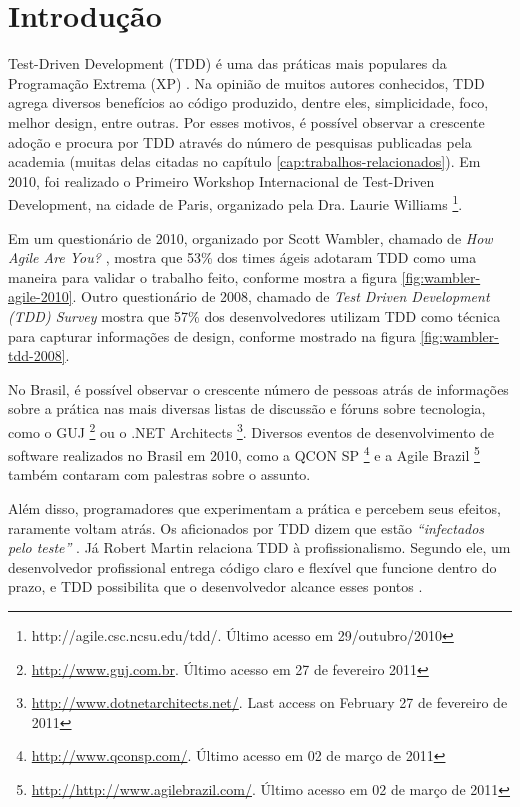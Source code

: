 \chapter{Introdução}
\label{cap:introducao}

Test-Driven Development (TDD) é uma das práticas mais populares da Programação
Extrema (XP) \cite{XPExplained}. 
Na opinião de muitos autores conhecidos, TDD agrega diversos benefícios ao
código produzido, dentre eles, simplicidade, foco, melhor design, entre outras.
Por esses motivos, é possível observar a crescente adoção e procura por TDD
através do número de pesquisas publicadas pela academia (muitas delas citadas no
capítulo \ref{cap:trabalhos-relacionados}). Em 2010, foi realizado o Primeiro
Workshop Internacional de Test-Driven Development, na cidade de Paris, 
organizado pela Dra. Laurie Williams \footnote{http://agile.csc.ncsu.edu/tdd/. 
Último acesso em 29/outubro/2010}.

Em um questionário de 2010, organizado por Scott Wambler, chamado de \textit{How
Agile Are You?} \cite{wambler-survey-agile}, mostra que 53\% dos times ágeis
adotaram TDD como uma maneira para validar o trabalho feito, conforme mostra a 
figura \ref{fig:wambler-agile-2010}. Outro questionário de 2008, 
chamado de \textit{Test Driven Development (TDD) Survey}
\cite{wambler-survey-tdd}  mostra que 57\% dos desenvolvedores utilizam TDD como
técnica para capturar informações de design, conforme mostrado na figura 
\ref{fig:wambler-tdd-2008}. 

No Brasil, é possível observar o crescente número de pessoas atrás de
informações sobre a prática nas mais diversas listas de discussão e fóruns sobre
tecnologia, como o GUJ \footnote{\url{http://www.guj.com.br}.
Último acesso em 27 de fevereiro 2011} ou o .NET Architects 
\footnote{\url{http://www.dotnetarchitects.net/}. Last access on February
27 de fevereiro de 2011}. Diversos eventos de desenvolvimento de
software realizados no Brasil em 2010, como a QCON SP
\footnote{\url{http://www.qconsp.com/}. Último acesso em 02 de março de 2011} e
a Agile Brazil \footnote{\url{http://http://www.agilebrazil.com/}. Último acesso
em 02 de março de 2011} também contaram com palestras sobre o assunto.

Além disso, programadores que experimentam a prática e percebem seus
efeitos, raramente voltam atrás. Os aficionados por TDD dizem que estão
\textit{``infectados pelo teste''} \cite{tdd-fearless}. Já Robert Martin
relaciona TDD à profissionalismo. Segundo ele, um desenvolvedor profissional
entrega código claro e flexível que funcione dentro do prazo, e TDD possibilita
que o desenvolvedor alcance esses pontos \cite{martin-profissionalismo}.

